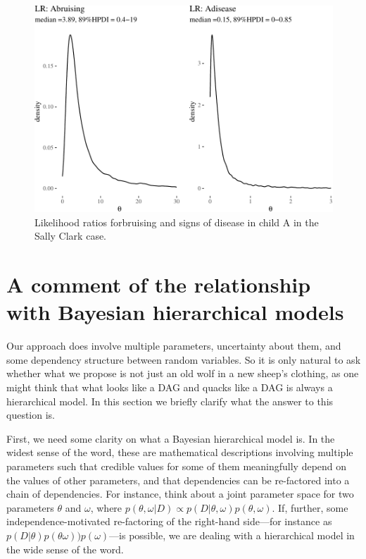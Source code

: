 \documentclass[
  10pt,
  dvipsnames,enabledeprecatedfontcommands]{scrartcl}
\begin{document}
\begin{figure}[H]


\begin{center}\includegraphics[width=0.9\linewidth]{imprecision_philosophical_paper2_files/figure-latex/SClrs-1} \end{center}

\caption{Likelihood ratios forbruising and signs of disease in child A in the Sally Clark case.}
\label{fig:SClrs}

\end{figure}

\hypertarget{a-comment-of-the-relationship-with-bayesian-hierarchical-models}{%
\section{A comment of the relationship with Bayesian hierarchical
models}\label{a-comment-of-the-relationship-with-bayesian-hierarchical-models}}


Our approach does involve multiple parameters, uncertainty about them,
and some dependency structure between random variables. So it is only
natural to ask whether what we propose is not just an old wolf in a new
sheep's clothing, as one might think that what looks like a DAG and
quacks like a DAG is always a hierarchical model. In this section we
briefly clarify what the answer to this question is.

First, we need some clarity on what a Bayesian hierarchical model is. In
the widest sense of the word, these are mathematical descriptions
involving multiple parameters such that credible values for some of them
meaningfully depend on the values of other parameters, and that
dependencies can be re-factored into a chain of dependencies. For
instance, think about a joint parameter space for two parameters
\(\theta\) and \(\omega\), where
\(p(\theta, \omega \vert D) \propto p(D \vert \theta, \omega)p(\theta, \omega)\).
If, further, some independence-motivated re-factoring of the right-hand
side---for instance as
\(p(D\vert \theta)p(\theta \omega)) p (\omega)\)---is possible, we are
dealing with a hierarchical model in the wide sense of the word.
\end{document}
